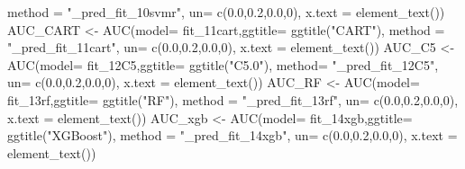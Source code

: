 \documentclass[
]{article}
\newenvironment{Shaded}{\begin{snugshade}}{\end{snugshade}}
\newcommand{\AttributeTok}[1]{\textcolor[rgb]{0.77,0.63,0.00}{#1}}
\newcommand{\DecValTok}[1]{\textcolor[rgb]{0.00,0.00,0.81}{#1}}
\newcommand{\FloatTok}[1]{\textcolor[rgb]{0.00,0.00,0.81}{#1}}
\newcommand{\FunctionTok}[1]{\textcolor[rgb]{0.00,0.00,0.00}{#1}}
\newcommand{\NormalTok}[1]{#1}
\newcommand{\OtherTok}[1]{\textcolor[rgb]{0.56,0.35,0.01}{#1}}
\newcommand{\StringTok}[1]{\textcolor[rgb]{0.31,0.60,0.02}{#1}}
\begin{document}
\begin{Shaded}
\begin{Highlighting}[]
               \AttributeTok{method =} \StringTok{"\_pred\_fit\_10svmr"}\NormalTok{,}
               \AttributeTok{un=} \FunctionTok{c}\NormalTok{(}\FloatTok{0.0}\NormalTok{,}\FloatTok{0.2}\NormalTok{,}\FloatTok{0.0}\NormalTok{,}\DecValTok{0}\NormalTok{),}
               \AttributeTok{x.text =} \FunctionTok{element\_text}\NormalTok{())}
\NormalTok{AUC\_CART }\OtherTok{\textless{}{-}} \FunctionTok{AUC}\NormalTok{(}\AttributeTok{model=}\NormalTok{ fit\_11cart,}\AttributeTok{ggtitle=} \FunctionTok{ggtitle}\NormalTok{(}\StringTok{"CART"}\NormalTok{),}
               \AttributeTok{method =} \StringTok{"\_pred\_fit\_11cart"}\NormalTok{,}
               \AttributeTok{un=} \FunctionTok{c}\NormalTok{(}\FloatTok{0.0}\NormalTok{,}\FloatTok{0.2}\NormalTok{,}\FloatTok{0.0}\NormalTok{,}\DecValTok{0}\NormalTok{),}
               \AttributeTok{x.text =} \FunctionTok{element\_text}\NormalTok{())}
\NormalTok{AUC\_C5 }\OtherTok{\textless{}{-}} \FunctionTok{AUC}\NormalTok{(}\AttributeTok{model=}\NormalTok{ fit\_12C5,}\AttributeTok{ggtitle=} \FunctionTok{ggtitle}\NormalTok{(}\StringTok{"C5.0"}\NormalTok{),}
                \AttributeTok{method=} \StringTok{"\_pred\_fit\_12C5"}\NormalTok{,}
               \AttributeTok{un=} \FunctionTok{c}\NormalTok{(}\FloatTok{0.0}\NormalTok{,}\FloatTok{0.2}\NormalTok{,}\FloatTok{0.0}\NormalTok{,}\DecValTok{0}\NormalTok{),}
               \AttributeTok{x.text =} \FunctionTok{element\_text}\NormalTok{())}
\NormalTok{AUC\_RF }\OtherTok{\textless{}{-}} \FunctionTok{AUC}\NormalTok{(}\AttributeTok{model=}\NormalTok{ fit\_13rf,}\AttributeTok{ggtitle=} \FunctionTok{ggtitle}\NormalTok{(}\StringTok{"RF"}\NormalTok{),}
              \AttributeTok{method =} \StringTok{"\_pred\_fit\_13rf"}\NormalTok{,}
               \AttributeTok{un=} \FunctionTok{c}\NormalTok{(}\FloatTok{0.0}\NormalTok{,}\FloatTok{0.2}\NormalTok{,}\FloatTok{0.0}\NormalTok{,}\DecValTok{0}\NormalTok{),}
               \AttributeTok{x.text =} \FunctionTok{element\_text}\NormalTok{())}
\NormalTok{AUC\_xgb }\OtherTok{\textless{}{-}} \FunctionTok{AUC}\NormalTok{(}\AttributeTok{model=}\NormalTok{ fit\_14xgb,}\AttributeTok{ggtitle=} \FunctionTok{ggtitle}\NormalTok{(}\StringTok{"XGBoost"}\NormalTok{),}
               \AttributeTok{method =} \StringTok{"\_pred\_fit\_14xgb"}\NormalTok{,}
               \AttributeTok{un=} \FunctionTok{c}\NormalTok{(}\FloatTok{0.0}\NormalTok{,}\FloatTok{0.2}\NormalTok{,}\FloatTok{0.0}\NormalTok{,}\DecValTok{0}\NormalTok{),}
               \AttributeTok{x.text =} \FunctionTok{element\_text}\NormalTok{())}
\end{Highlighting}
\end{Shaded}
\end{document}
